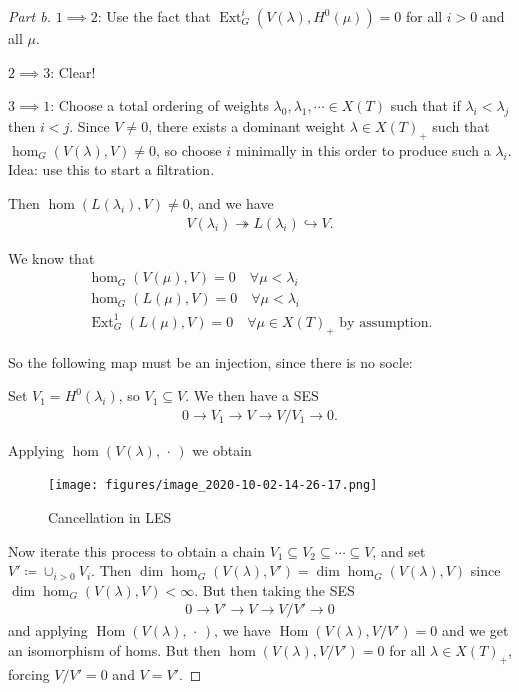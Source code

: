 \begin{proof}[Part b]

\(1\implies 2\): Use the fact that
\(\operatorname{Ext}^i_G(V(\lambda), H^0(\mu)) = 0\) for all \(i>0\) and
all \(\mu\).

\(2\implies 3\): Clear!

\(3\implies 1\): Choose a total ordering of weights
\(\lambda_0, \lambda_1, \cdots \in X(T)\) such that if
\(\lambda_i < \lambda_j\) then \(i<j\). Since \(V\neq 0\), there exists
a dominant weight \(\lambda \in X(T)_+\) such that
\(\hom_G(V(\lambda), V) \neq 0\), so choose \(i\) minimally in this
order to produce such a \(\lambda_i\). Idea: use this to start a
filtration.

Then \(\hom(L(\lambda_i), V) \neq 0\), and we have
\begin{align*}  
V(\lambda_i) \twoheadrightarrow L(\lambda_i) \hookrightarrow V
.\end{align*}

We know that
\begin{align*}  
\hom_G(V(\mu), V) = 0 \quad \forall \mu < \lambda_i \\
\hom_G(L(\mu), V) = 0 \quad \forall \mu < \lambda_i \\
\operatorname{Ext}_G^1(L(\mu), V) = 0 \quad \forall \mu \in X(T)_+ \text{ by assumption}
.\end{align*}

So the following map must be an injection, since there is no socle:

\begin{center}
\end{center}

Set \(V_1 = H^0(\lambda_i)\), so \(V_1 \subseteq V\). We then have a SES
\begin{align*}  
0 \to V_1 \to V \to V/V_1 \to 0 
.\end{align*}

Applying \(\hom(V(\lambda), {\,\cdot\,})\) we obtain

\begin{figure}
\centering
\texttt{[image: figures/image\_2020-10-02-14-26-17.png]}
\caption{Cancellation in LES}
\end{figure}

Now iterate this process to obtain a chain
\(V_1 \subseteq V_2 \subseteq \cdots \subseteq V\), and set
\(V' \coloneqq\cup_{i>0} V_i\). Then
\(\dim \hom_G(V(\lambda), V') = \dim \hom_G( V(\lambda), V )\) since
\(\dim \hom_G(V(\lambda), V) < \infty\). But then taking the SES
\begin{align*}  
0\to V' \to V \to V/V' \to 0
\end{align*}
and applying \({\operatorname{Hom}}(V(\lambda), {\,\cdot\,})\), we have
\({\operatorname{Hom}}(V(\lambda), V/V') = 0\) and we get an isomorphism
of homs. But then \(\hom(V(\lambda), V/V') = 0\) for all
\(\lambda \in X(T)_+\), forcing \(V/V'=0\) and \(V=V'\).

\end{proof}

